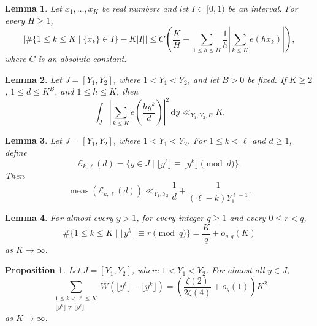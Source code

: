 \documentclass[10pt,a4paper]{amsart}
\newtheorem{lemma}{Lemma}
\newtheorem{proposition}{Proposition}
\begin{document}
    \begin{lemma}\label{lem-erdos-turan}
        Let $x_1,\ldots,x_K$ be real numbers and let $I\subset[0,1)$ be an interval. For every $H\ge1$,
        $$
        \left|\#\bigl\{1\le k\le K\mid \{x_k\}\in I\bigr\}-K|I|\right|
        \le C\left(\frac{K}{H}+\sum_{1\le h\le H}\frac1h\left|\sum_{k\le K}e(hx_k)\right|\right),
        $$
        where $C$ is an absolute constant.
    \end{lemma}

    \begin{lemma}\label{lem-exp-sum}
        Let $J=[Y_1,Y_2]$, where $1<Y_1<Y_2$, and let $B>0$ be fixed. If $K\ge2$, $1\le d\le K^B$, and $1\le h\le K$, then
        $$
        \int_J\left|\sum_{k\le K}e\left(\frac{h y^k}{d}\right)\right|^2\,\mathrm{d}y
        \ll_{Y_1,Y_2,B} K.
        $$
    \end{lemma}

    \begin{lemma}\label{lem-collision}
        Let $J=[Y_1,Y_2]$, where $1<Y_1<Y_2$. For $1\le k<\ell$ and $d\ge1$, define
        $$
        \mathcal{E}_{k,\ell}(d)=\bigl\{y\in J\mid
        \lfloor y^\ell\rfloor\equiv \lfloor y^k\rfloor\pmod d\bigr\}.
        $$
        Then
        $$
        \operatorname{meas}(\mathcal{E}_{k,\ell}(d))
        \ll_{Y_1,Y_2}
        \frac1d+\frac1{(\ell-k)Y_1^{\ell-1}}.
        $$
    \end{lemma}

    \begin{lemma}\label{lem-residue-ud}
        For almost every $y>1$, for every integer $q\ge1$ and every $0\le r<q$,
        $$
        \#\{1\le k\le K\mid \lfloor y^k\rfloor\equiv r\pmod q\}
        =\frac Kq+o_{y,q}(K)
        $$
        as $K\to\infty$.
    \end{lemma}

    \begin{proposition}\label{prop-metric}
        Let $J=[Y_1,Y_2]$, where $1<Y_1<Y_2$. For almost all $y\in J$,
        \begin{equation}\label{eq-pair-asymptotic}
            \sum_{\substack{1\le k<\ell\le K\\
                    \lfloor y^k\rfloor\ne\lfloor y^\ell\rfloor}}
            W\!\left(\lfloor y^\ell\rfloor-\lfloor y^k\rfloor\right)
            =\left(\frac{\zeta(2)}{2\zeta(4)}+o_y(1)\right)K^2
        \end{equation}
        as $K\to\infty$.
    \end{proposition}
\end{document}
